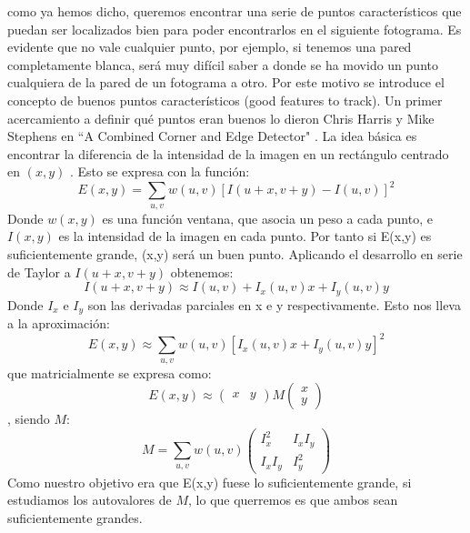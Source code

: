 \documentclass[a4paper,openright, 12pt]{book}
\begin{document}
como ya hemos dicho, queremos encontrar una serie de puntos característicos que puedan ser localizados bien para poder encontrarlos en el siguiente fotograma. Es evidente que no vale cualquier punto, por ejemplo, si tenemos una pared completamente blanca, será muy difícil saber a donde se ha movido un punto cualquiera de la pared de un fotograma a otro. Por este motivo se introduce el concepto de buenos puntos característicos
(good features to track).
Un primer acercamiento a definir qué puntos eran buenos lo dieron Chris Harris y Mike Stephens en ``A Combined Corner and Edge Detector" \cite{harris88}.
La idea básica es encontrar la diferencia de la intensidad de la imagen en un rectángulo centrado en $(x,y)$ . Esto se expresa con la función:
\begin{equation}
E(x,y)= \sum_{u,v} w(u,v) [I(u+x,v+y)-I(u,v)]^2
\end{equation}
Donde $w(x,y)$ es una función ventana, que asocia un peso a cada punto, e $I(x,y)$ es la intensidad de la imagen en cada punto.
Por tanto si E(x,y) es suficientemente grande, (x,y) será un buen punto.
Aplicando el desarrollo en serie de Taylor a $I(u+x,v+y)$ obtenemos:
\begin{equation}
I(u+x,v+y) \approx I(u, v) + I_x(u,v)x + I_y(u,v)y
\end{equation}
Donde $I_x$ e $I_y$ son las derivadas parciales en x e y respectivamente.
Esto nos lleva a la aproximación:
\begin{equation*}
E(x,y) \approx \sum_{u,v} w(u,v)[I_x(u,v)x + I_y(u,v)y]^2
\end{equation*}
que matricialmente se expresa como:
\begin{equation}
E(x,y) \approx 
\left( \begin{array}{cc}x & y \end{array} \right)
M 
\left( \begin{array}{c}x\\y \end{array} \right)
\end{equation}, siendo $M$:
\begin{equation*}
M = \sum_{u,v}w(u,v)
\left( \begin{array}{cc}
I_x^2 & I_xI_y\\
I_xI_y & I_y^2
 \end{array} \right)
\end{equation*}
Como nuestro objetivo era que E(x,y) fuese lo suficientemente grande, si estudiamos los autovalores de $M$, lo que querremos es que ambos sean suficientemente grandes.
\end{document}
